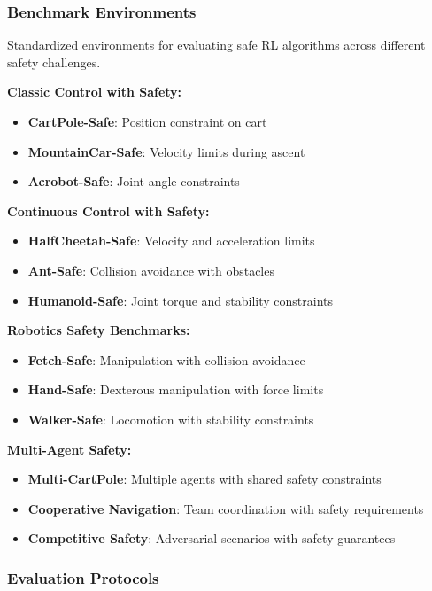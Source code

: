 \documentclass[12pt]{article}
\begin{document}
{{{{\subsubsection{Benchmark Environments}

Standardized environments for evaluating safe RL algorithms across different safety challenges.

\textbf{Classic Control with Safety:}
\begin{itemize}
\item \textbf{CartPole-Safe}: Position constraint on cart
\item \textbf{MountainCar-Safe}: Velocity limits during ascent
\item \textbf{Acrobot-Safe}: Joint angle constraints
\end{itemize}

\textbf{Continuous Control with Safety:}
\begin{itemize}
\item \textbf{HalfCheetah-Safe}: Velocity and acceleration limits
\item \textbf{Ant-Safe}: Collision avoidance with obstacles
\item \textbf{Humanoid-Safe}: Joint torque and stability constraints
\end{itemize}

\textbf{Robotics Safety Benchmarks:}
\begin{itemize}
\item \textbf{Fetch-Safe}: Manipulation with collision avoidance
\item \textbf{Hand-Safe}: Dexterous manipulation with force limits
\item \textbf{Walker-Safe}: Locomotion with stability constraints
\end{itemize}

\textbf{Multi-Agent Safety:}
\begin{itemize}
\item \textbf{Multi-CartPole}: Multiple agents with shared safety constraints
\item \textbf{Cooperative Navigation}: Team coordination with safety requirements
\item \textbf{Competitive Safety}: Adversarial scenarios with safety guarantees
\end{itemize}

\subsubsection{Evaluation Protocols}

}}}}
\end{document}
